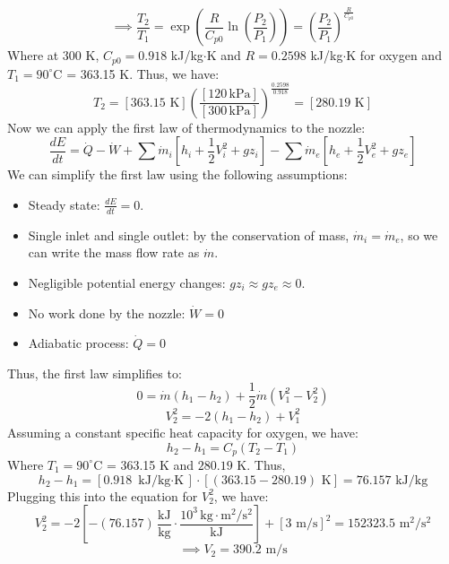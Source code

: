 \documentclass[12pt]{article}
\begin{document}
\[\implies \frac{T_2}{T_1} = \exp\left(\frac{R}{C_{p0}}\ln\left(\frac{P_2}{P_1}\right)\right) = \left(\frac{P_2}{P_1}\right)^{\frac{R}{C_{p0}}}\]
Where at 300 K, $C_{p0} = 0.918$ kJ/kg$\cdot$K and $R = 0.2598$ kJ/kg$\cdot$K for oxygen and $T_1 = 90^\circ$C = 363.15 K. Thus, we have:
\[T_2 = [363.15\text{ K}]\left(\frac{[120\,\text{kPa}]}{[300\,\text{kPa}]}\right)^{\frac{0.2598}{0.918}}=[280.19\text{ K}]\]
Now we can apply the first law of thermodynamics to the nozzle:
\[\frac{dE}{dt} = \dot{Q} - \dot{W} +\sum \dot{m}_i \left[h_i +\frac{1}{2}V_i^2 + gz_i\right] - \sum \dot{m}_e \left[h_e +\frac{1}{2}V_e^2 + gz_e\right]\]
We can simplify the first law using the following assumptions:
\begin{itemize}
    \item Steady state: $\frac{dE}{dt} = 0$. 
    \item Single inlet and single outlet: by the conservation of mass, $\dot{m}_i = \dot{m}_e$, so we can write the mass flow rate as $\dot{m}$.
    \item Negligible potential energy changes: $gz_i \approx gz_e \approx 0$.
    \item No work done by the nozzle: $\dot{W} = 0$
    \item Adiabatic process: $\dot{Q} = 0$
\end{itemize}
Thus, the first law simplifies to:
\[0 =\dot{m}(h_1 - h_2) + \frac{1}{2}\dot{m}(V_1^2 - V_2^2)\]
\[V_2^2  = -2(h_1 - h_2) + V_1^2\]
Assuming a constant specific heat capacity for oxygen, we have:
\[h_2 - h_1 = C_p (T_2 - T_1)\]
Where $T_1 = 90^\circ$C = 363.15 K and $280.19\text{ K}$. Thus,
\[h_2 - h_1 = [0.918 \text{ kJ/kg$\cdot$K}] \cdot [(363.15 - 280.19) \text{ K}] = 76.157 \text{ kJ/kg}\]
Plugging this into the equation for $V_2^2$, we have:
\[V_2^2 = -2\left[-(76.157)\,\frac{\text{kJ}}{\text{kg}}\cdot\frac{10^3\,\text{kg}\cdot\text{m}^2/\text{s}^2}{\text{kJ}}\right] + [3 \text{ m/s}]^2 =152323.5 \text{ m}^2/\text{s}^2\]
\[\implies \boxed{V_2 = 390.2 \text{ m/s}}\]
\end{document}
